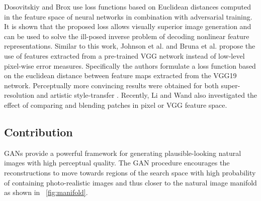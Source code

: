 \documentclass[10pt,twocolumn,letterpaper]{article}
\begin{document}
	Dosovitskiy and Brox \cite{dosovitskiy2016generating} use loss functions based on Euclidean distances computed in the feature space of neural networks in combination with adversarial training. It is shown that the proposed loss allows visually superior image generation and can be used to solve the ill-posed inverse problem of decoding nonlinear feature representations.
	Similar to this work, Johnson et al. \cite{Johnson16PercepLoss} and Bruna et al. \cite{bruna2016super} propose the use of features extracted from a pre-trained VGG network instead of low-level pixel-wise error measures. Specifically the authors formulate a loss function based on the euclidean distance between feature maps extracted from the VGG19 \cite{simonyan2014very} network. Perceptually more convincing results were obtained for both super-resolution and artistic style-transfer \cite{Gatys2015nips,Gatys2016cvpr}. Recently, Li and Wand \cite{Li2016} also investigated the effect of comparing and blending patches in pixel or VGG feature space.

\subsection{Contribution}
	\acp{GAN} provide a powerful framework for generating plausible-looking natural images with high perceptual quality. 
	The \ac{GAN} procedure encourages the reconstructions to move towards regions of the search space with high probability of containing photo-realistic images and thus closer to the natural image manifold as shown in \figurename~\ref{fig:manifold}.
\end{document}
